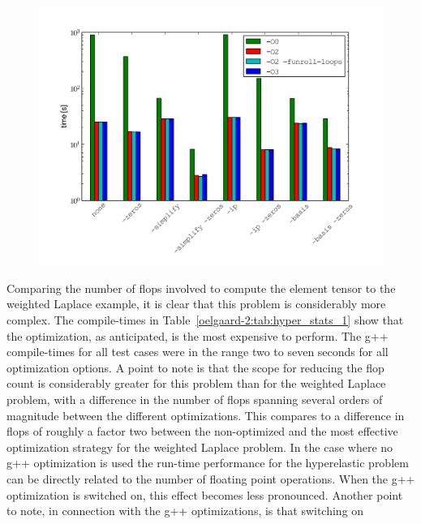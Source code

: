 \begin{figure}
          {\includegraphics[width=\mediumfullfig]{chapters/oelgaard-2/pdf/runtime_hyperelasticity.pdf}}
\end{figure}
%
Comparing the number of flops involved to compute the element tensor
to the weighted Laplace example, it is clear that this problem is
considerably more complex.  The \ffc{} compile-times in
Table~\ref{oelgaard-2:tab:hyper_stats_1} show that the 
optimization, as anticipated, is the most expensive to perform.  The
g++ compile-times for all test cases were in the range two to seven
seconds for all optimization options.  A point to note is that the
scope for reducing the flop count is considerably greater for this
problem than for the weighted Laplace problem, with a difference in
the number of flops spanning several orders of magnitude between the
different \ffc{} optimizations.  This compares to a difference in
flops of roughly a factor two between the non-optimized and the most
effective optimization strategy for the weighted Laplace problem.  In
the case where no g++ optimization is used the run-time performance
for the hyperelastic problem can be directly related to the number of
floating point operations.  When the g++ optimization  is
switched on, this effect becomes less pronounced.  Another point to
note, in connection with the g++ optimizations, is that switching on
